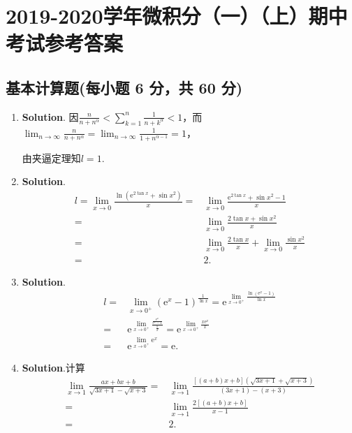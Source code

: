 \documentclass[../Main.tex]{subfiles}
\begin{document}
\chapter{2019-2020学年微积分（一）（上）期中考试参考答案}
\section{基本计算题(每小题 6 分，共 60 分)}
\begin{enumerate}
    \item \textbf{Solution}. 因$\frac{n}{n+n^{\alpha}}<\sum_{k=1}^{n}\frac{1}{n+k^{\alpha}}
              <1$，而$\lim_{n\to\infty}\frac{n}{n+n^{\alpha}}=\lim_{n\to\infty}\frac{1}{1+n^{\alpha-1}}
              =1$，

          由夹逼定理知$l=1$.

    \item \textbf{Solution}.
          \[
              \begin{aligned}
                  l=\lim_{x\to0}\frac{\ln\left(\mathrm{e}^{2\tan x}+\sin x^2\right)}{x}= & \lim_{x\to0}\frac{\mathrm{e}^{2\tan x}+\sin x^2-1}{x}        \\
                  =                                                                      & \lim_{x\to0}\frac{2\tan x+\sin x^2}{x}                       \\
                  =                                                                      & \lim_{x\to0}\frac{2\tan x}{x}+\lim_{x\to0}\frac{\sin x^2}{x} \\
                  =                                                                      & 2.
              \end{aligned}
          \]

    \item \textbf{Solution}.
          \[
              \begin{aligned}
                  l= & \lim_{x\to0^+}\left(\mathrm{e}^{x}-1\right)^{\frac{1}{\ln x}}= \mathrm{e}^{\lim\limits_{x\to0^+}\frac{\ln\left(\mathrm{e}^x-1\right)}{\ln x}}        \\
                  =  & \mathrm{e}^{\lim\limits_{x\to0^+}\frac{\frac{\mathrm{e}^x}{\mathrm{e}^x-1}}{\frac{1}{x}}}= \mathrm{e}^{\lim\limits_{x\to0^+}\frac{x\mathrm{e}^x}{x}} \\
                  =  & \mathrm{e}^{\lim\limits_{x\to0^+}\mathrm{e}^x}= \mathrm{e}.
              \end{aligned}
          \]

    \item \textbf{Solution}.计算
          \[
              \begin{aligned}
                  \lim_{x\to1}\frac{ax+bx+b}{\sqrt{3x+1}-\sqrt{x+3}}= & \lim_{x\to1}\frac{[(a+b)x+b]\left(\sqrt{3x+1}+\sqrt{x+3}\right)}{(3x+1)-(x+3)} \\
                  =                                                   & \lim_{x\to1}\frac{2[(a+b)x+b]}{x-1}                                            \\
                  =                                                   & 2.
              \end{aligned}
          \]


\end{enumerate}
\end{document}
